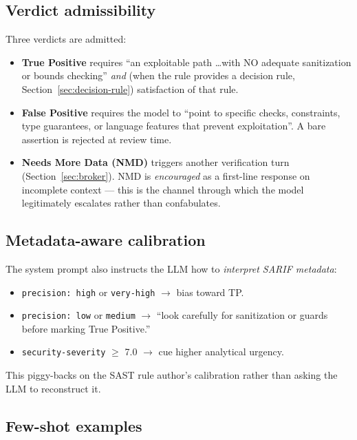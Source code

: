 \documentclass[11pt,a4paper]{article}
\begin{document}
\subsection{Verdict admissibility}

Three verdicts are admitted:

\begin{itemize}[leftmargin=*]
\item \textbf{True Positive} requires ``an exploitable path \ldots with
  NO adequate sanitization or bounds checking'' \emph{and} (when the
  rule provides a decision rule, Section~\ref{sec:decision-rule})
  satisfaction of that rule.
\item \textbf{False Positive} requires the model to ``point to specific
  checks, constraints, type guarantees, or language features that
  prevent exploitation''. A bare assertion is rejected at review time.
\item \textbf{Needs More Data (NMD)} triggers another verification turn
  (Section~\ref{sec:broker}). NMD is \emph{encouraged} as a first-line
  response on incomplete context --- this is the channel through which
  the model legitimately escalates rather than confabulates.
\end{itemize}

\subsection{Metadata-aware calibration}

The system prompt also instructs the LLM how to \emph{interpret SARIF
metadata}:

\begin{itemize}[leftmargin=*]
\item \texttt{precision: high} or \texttt{very-high} $\rightarrow$ bias
  toward TP.
\item \texttt{precision: low} or \texttt{medium} $\rightarrow$
  ``look carefully for sanitization or guards before marking True
  Positive.''
\item \texttt{security-severity} $\geq$ 7.0 $\rightarrow$ cue higher
  analytical urgency.
\end{itemize}

This piggy-backs on the SAST rule author's calibration rather than
asking the LLM to reconstruct it.

\subsection{Few-shot examples}
\end{document}
